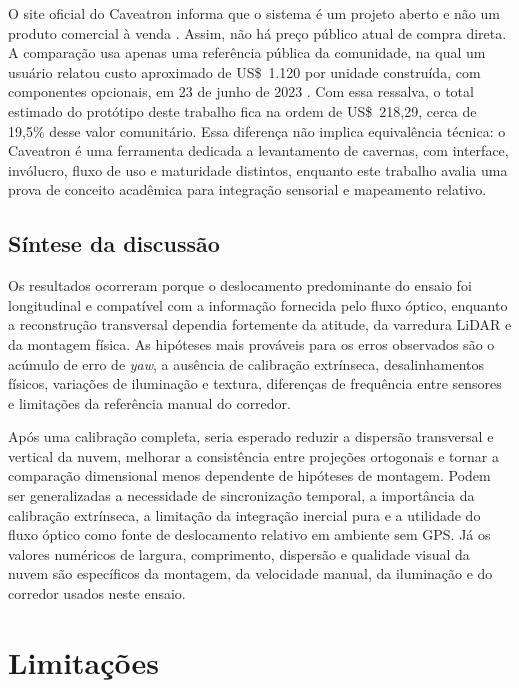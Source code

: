 O site oficial do Caveatron informa que o sistema é um projeto aberto e não um produto comercial à venda \parencite{caveatron2026official}. Assim, não há preço público atual de compra direta. A comparação usa apenas uma referência pública da comunidade, na qual um usuário relatou custo aproximado de US\$~1.120 por unidade construída, com componentes opcionais, em 23 de junho de 2023 \parencite{caveatronDiscuss2023cost}. Com essa ressalva, o total estimado do protótipo deste trabalho fica na ordem de US\$~218,29, cerca de 19,5\% desse valor comunitário. Essa diferença não implica equivalência técnica: o Caveatron é uma ferramenta dedicada a levantamento de cavernas, com interface, invólucro, fluxo de uso e maturidade distintos, enquanto este trabalho avalia uma prova de conceito acadêmica para integração sensorial e mapeamento relativo.

\subsection{Síntese da discussão}

Os resultados ocorreram porque o deslocamento predominante do ensaio foi longitudinal e compatível com a informação fornecida pelo fluxo óptico, enquanto a reconstrução transversal dependia fortemente da atitude, da varredura LiDAR e da montagem física. As hipóteses mais prováveis para os erros observados são o acúmulo de erro de \textit{yaw}, a ausência de calibração extrínseca, desalinhamentos físicos, variações de iluminação e textura, diferenças de frequência entre sensores e limitações da referência manual do corredor.

Após uma calibração completa, seria esperado reduzir a dispersão transversal e vertical da nuvem, melhorar a consistência entre projeções ortogonais e tornar a comparação dimensional menos dependente de hipóteses de montagem. Podem ser generalizadas a necessidade de sincronização temporal, a importância da calibração extrínseca, a limitação da integração inercial pura e a utilidade do fluxo óptico como fonte de deslocamento relativo em ambiente sem GPS. Já os valores numéricos de largura, comprimento, dispersão e qualidade visual da nuvem são específicos da montagem, da velocidade manual, da iluminação e do corredor usados neste ensaio.

\section{Limitações}
\label{sec:limitacoes}

